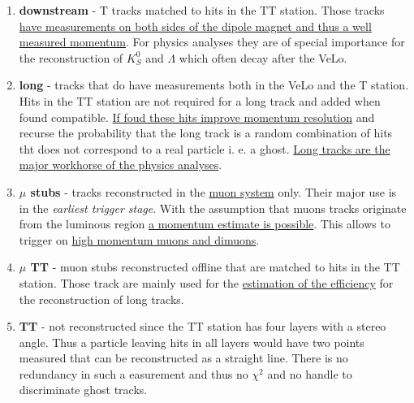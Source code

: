 \documentclass[11pt,a4paper,twoside]{article}
\begin{document}
\begin{enumerate}
\begin{enumerate}
            \item \textbf{downstream} - T tracks matched to hits in the TT station. Those tracks \underline{have measurements on both sides of the dipole magnet and thus a well measured momentum}. For physics analyses they are of special importance for the reconstruction of $K^{0}_{S}$ and $\Lambda$ which often decay after the VeLo.
            
            \item \textbf{long} - tracks that do have measurements both in the VeLo and the T station. Hits in the TT station are not required for a long track and added when found compatible. \underline{If foud these hits improve momentum resolution} and recurse the probability that the long track is a random combination of hits tht does not correspond to a real particle i. e. a ghost. \underline{Long tracks are the major workhorse of the physics analyses}.
            
            \item \textbf{$\mu$ stubs} - tracks reconstructed in the \underline{muon system} only. Their major use is in the \textit{earliest trigger stage}. With the assumption that muons tracks originate from the luminous region \underline{a momentum estimate is possible}. This allows to trigger on \underline{high momentum muons and dimuons}.
            
            \item \textbf{$\mu$ TT} - muon stubs reconstructed offline that are matched to hits in the TT station. Those track are mainly used for the \underline{estimation of the efficiency} for the reconstruction of long tracks.
            
            \item \textbf{TT} - not reconstructed since the TT station has four layers with a stereo angle. Thus a particle leaving hits in all layers would have two points measured that can be reconstructed as a straight line. There is no redundancy in such a easurement and thus no $\chi^2$ and no handle to discriminate ghost tracks.
        \end{enumerate}


\end{enumerate}
\end{document}
